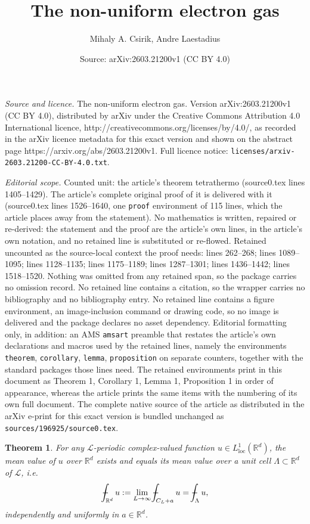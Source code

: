 \documentclass[10pt,a4paper]{amsart}
\title{The non-uniform electron gas}
\author{Mihaly A. Csirik, Andre Laestadius}
\date{Source: arXiv:2603.21200v1 (CC BY 4.0)}
\newtheorem{theorem}{Theorem}
\newcommand{\LC}{\mathcal{L}}
\newcommand{\Lloc}{L_{\mathrm{loc}}} %
\newcommand{\RR}{\mathbb{R}}
\def\XXint#1#2#3{{\setbox0=\hbox{$#1{#2#3}{\int}$ }
\vcenter{\hbox{$#2#3$ }}\kern-.6\wd0}}
\def\Xint#1{\mathchoice
{\XXint\displaystyle\textstyle{#1}}%
{\XXint\textstyle\scriptstyle{#1}}%
{\XXint\scriptstyle\scriptscriptstyle{#1}}%
{\XXint\scriptscriptstyle\scriptscriptstyle{#1}}%
\!\int}
\def\dashint{\Xint-}
\begin{document}
\maketitle

\noindent\emph{Source and licence.} The non-uniform electron gas. Version arXiv:2603.21200v1 (CC BY 4.0), distributed by arXiv under the Creative Commons Attribution 4.0 International licence, http://creativecommons.org/licenses/by/4.0/, as recorded in the arXiv licence metadata for this exact version and shown on the abstract page https://arxiv.org/abs/2603.21200v1. Full licence notice: \texttt{licenses/arxiv-2603.21200-CC-BY-4.0.txt}.\par\smallskip

\noindent\textit{Editorial scope.} Counted unit: the article's theorem tetrathermo (source0.tex lines 1405--1429). The article's complete original proof of it is delivered with it (source0.tex lines 1526--1640, one \texttt{proof} environment of 115 lines, which the article places away from the statement). No mathematics is written, repaired or re-derived: the statement and the proof are the article's own lines, in the article's own notation, and no retained line is substituted or re-flowed.  Retained uncounted as the source-local context the proof needs: lines 262--268; lines 1089--1095; lines 1128--1135; lines 1175--1189; lines 1287--1301; lines 1436--1442; lines 1518--1520.  Nothing was omitted from any retained span, so the package carries no omission record.  No retained line contains a citation, so the wrapper carries no bibliography and no bibliography entry.  No retained line contains a figure environment, an image-inclusion command or drawing code, so no image is delivered and the package declares no asset dependency.  Editorial formatting only, in addition: an AMS \texttt{amsart} preamble that restates the article's own declarations and macros used by the retained lines, namely the environments \texttt{theorem}, \texttt{corollary}, \texttt{lemma}, \texttt{proposition} on separate counters, together with the standard packages those lines need.  The retained environments print in this document as Theorem 1, Corollary 1, Lemma 1, Proposition 1 in order of appearance, whereas the article prints the same items with the numbering of its own full document.  The complete native source of the article as distributed in the arXiv e-print for this exact version is bundled unchanged as \texttt{sources/196925/source0.tex}.
\begin{theorem}\label{permeanthm}
For any $\LC$-periodic complex-valued function $u\in\Lloc^1(\RR^d)$, the mean value of $u$ over $\RR^d$ exists and equals its mean value over a unit cell $\Lambda\subset\RR^d$ of $\LC$, i.e.
\begin{equation}\label{permean}
\dashint_{\RR^d} u:=\lim_{L\to\infty} \dashint_{C_L+a} u =\dashint_{\Lambda} u,
\end{equation}
independently and uniformly in $a\in\RR^d$.
\end{theorem}
\end{document}
